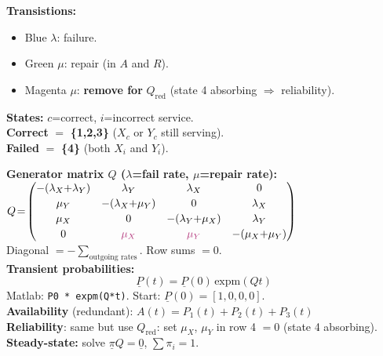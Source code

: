 \documentclass[10pt,a4paper]{article}
\begin{document}
\begin{minipage}[t]{0.46\textwidth}
\begin{center}
\end{center}
\vspace{1pt}
\begin{notebox}
\textbf{Transistions:}
\begin{itemize}
  \item \textcolor{blue!70!black}{Blue} $\lambda$: failure.
  \item \textcolor{green!55!black}{Green} $\mu$: repair (in $A$ and $R$).
  \item \textcolor{magenta!70!black}{Magenta} $\mu$: \textbf{remove for} $Q_\text{red}$ (state 4 absorbing $\Rightarrow$ reliability).
\end{itemize}
\end{notebox}
\begin{defbox}
\textbf{States:} $c$=correct, $i$=incorrect service.\\
\textcolor{green!55!black}{\textbf{Correct}} $=$ \textcolor{green!55!black}{\textbf{\{1,2,3\}}} ($X_c$ or $Y_c$ still serving).\\
\textcolor{red!65!black}{\textbf{Failed}} $=$ \textcolor{red!65!black}{\textbf{\{4\}}} (both $X_i$ and $Y_i$).
\end{defbox}
\end{minipage}\hfill
\begin{minipage}[t]{0.51\textwidth}
\vspace{0pt}
\begin{keybox}
\textbf{Generator matrix $Q$ ($\lambda$=fail rate, $\mu$=repair rate):}\\[3pt]
$Q\!=\!\left(\begin{matrix}
{-(\lambda_X{+}\lambda_Y)} & \lambda_Y & \lambda_X & 0 \\[2pt]
\mu_Y & {-(\lambda_X{+}\mu_Y)} & 0 & \lambda_X \\[2pt]
\mu_X & 0 & {-(\lambda_Y{+}\mu_X)} & \lambda_Y \\[2pt]
0 & \textcolor{magenta!70!black}{\mu_X} & \textcolor{magenta!70!black}{\mu_Y} & {-(\mu_X{+}\mu_Y)}
\end{matrix}\right)$\\[5pt]
Diagonal $= -\!\sum_\text{outgoing rates}$. Row sums $= 0$.\\[4pt]
\textbf{Transient probabilities:}
\[ \underline{P}(t) = \underline{P}(0)\,\mathrm{expm}(Qt) \]
Matlab: \texttt{P0 * expm(Q*t)}. Start: $\underline{P}(0)=[1,0,0,0]$.\\[4pt]
\textbf{Availability} (redundant): $A(t) = P_1(t)+P_2(t)+P_3(t)$\\[2pt]
\textbf{Reliability}: same but use $Q_\text{red}$: set \textcolor{magenta!70!black}{$\mu_X$, $\mu_Y$ in row 4} $=0$ (state 4 absorbing).\\[4pt]
\textbf{Steady-state:} solve $\underline{\pi}Q=\underline{0}$, $\sum\pi_i=1$.
\end{keybox}
\end{minipage}
\end{document}
